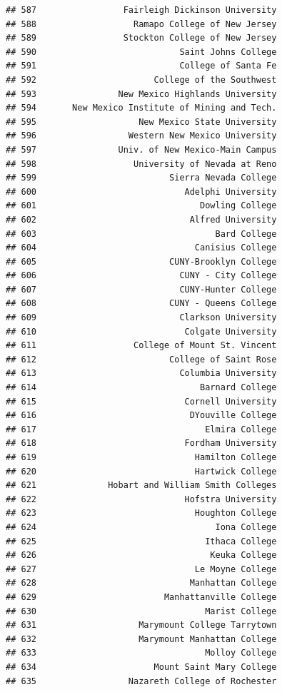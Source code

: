 \documentclass[]{article}
\begin{document}
\begin{verbatim}
## 587                 Fairleigh Dickinson University
## 588                   Ramapo College of New Jersey
## 589                 Stockton College of New Jersey
## 590                            Saint Johns College
## 591                            College of Santa Fe
## 592                       College of the Southwest
## 593                New Mexico Highlands University
## 594       New Mexico Institute of Mining and Tech.
## 595                    New Mexico State University
## 596                  Western New Mexico University
## 597                Univ. of New Mexico-Main Campus
## 598                   University of Nevada at Reno
## 599                          Sierra Nevada College
## 600                             Adelphi University
## 601                                Dowling College
## 602                              Alfred University
## 603                                   Bard College
## 604                               Canisius College
## 605                          CUNY-Brooklyn College
## 606                            CUNY - City College
## 607                            CUNY-Hunter College
## 608                          CUNY - Queens College
## 609                            Clarkson University
## 610                             Colgate University
## 611                   College of Mount St. Vincent
## 612                          College of Saint Rose
## 613                            Columbia University
## 614                                Barnard College
## 615                             Cornell University
## 616                              DYouville College
## 617                                 Elmira College
## 618                             Fordham University
## 619                               Hamilton College
## 620                               Hartwick College
## 621              Hobart and William Smith Colleges
## 622                             Hofstra University
## 623                               Houghton College
## 624                                   Iona College
## 625                                 Ithaca College
## 626                                  Keuka College
## 627                               Le Moyne College
## 628                              Manhattan College
## 629                         Manhattanville College
## 630                                 Marist College
## 631                    Marymount College Tarrytown
## 632                    Marymount Manhattan College
## 633                                 Molloy College
## 634                       Mount Saint Mary College
## 635                  Nazareth College of Rochester

\end{verbatim}
\end{document}
